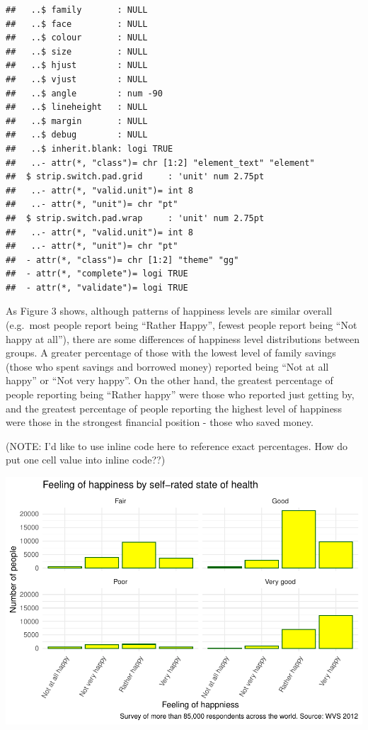 \documentclass[man, fleqn, noextraspace,floatsintext]{apa6}
\begin{document}
\begin{verbatim}
##   ..$ family       : NULL
##   ..$ face         : NULL
##   ..$ colour       : NULL
##   ..$ size         : NULL
##   ..$ hjust        : NULL
##   ..$ vjust        : NULL
##   ..$ angle        : num -90
##   ..$ lineheight   : NULL
##   ..$ margin       : NULL
##   ..$ debug        : NULL
##   ..$ inherit.blank: logi TRUE
##   ..- attr(*, "class")= chr [1:2] "element_text" "element"
##  $ strip.switch.pad.grid     : 'unit' num 2.75pt
##   ..- attr(*, "valid.unit")= int 8
##   ..- attr(*, "unit")= chr "pt"
##  $ strip.switch.pad.wrap     : 'unit' num 2.75pt
##   ..- attr(*, "valid.unit")= int 8
##   ..- attr(*, "unit")= chr "pt"
##  - attr(*, "class")= chr [1:2] "theme" "gg"
##  - attr(*, "complete")= logi TRUE
##  - attr(*, "validate")= logi TRUE
\end{verbatim}

As Figure 3 shows, although patterns of happiness levels are similar overall (e.g.~most people report being \enquote{Rather Happy}, fewest people report being \enquote{Not happy at all}), there are some differences of happiness level distributions between groups. A greater percentage of those with the lowest level of family savings (those who spent savings and borrowed money) reported being \enquote{Not at all happy} or \enquote{Not very happy}. On the other hand, the greatest percentage of people reporting being \enquote{Rather happy} were those who reported just getting by, and the greatest percentage of people reporting the highest level of happiness were those in the strongest financial position - those who saved money.

(NOTE: I'd like to use inline code here to reference exact percentages. How do put one cell value into inline code??)

\includegraphics{610_final_files/figure-latex/trust and health-1.pdf}
\end{document}
